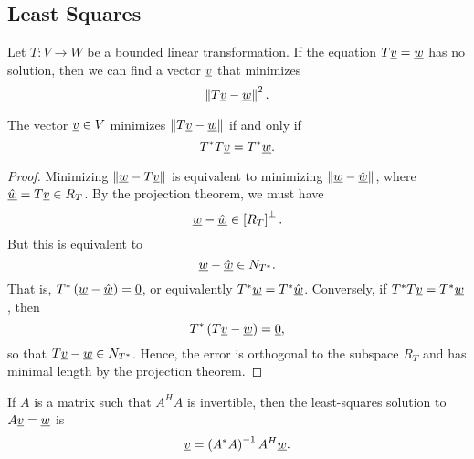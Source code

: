 \subsection{Least Squares}

Let $T : V \rightarrow W$ be a bounded linear transformation.
If the equation $T \underline{v} = \underline{w}$ has no solution, then we can find a vector $\underline{v}$ that minimizes
\begin{equation*}
\left\| T \underline{v} - \underline{w} \right\|^2.
\end{equation*}

\begin{theorem}
The vector $\underline{v} \in V$ minimizes $\left\| T \underline{v} - \underline{w} \right\|$ if and only if
\begin{equation*}
T^* T \underline{v} = T^* \underline{w} .
\end{equation*}
\end{theorem}
\begin{proof}
Minimizing $\left\| \underline{w} - T \underline{v} \right\|$ is equivalent to minimizing $\left\| \underline{w} - \hat{\underline{w}} \right\|$, where $\hat{\underline{w}} = T\underline{v} \in R_T$.
By the projection theorem, we must have
\begin{equation*}
\underline{w} - \hat{\underline{w}} \in \left[ R_T \right]^{\bot} .
\end{equation*}
But this is equivalent to
\begin{equation*}
\underline{w} - \hat{\underline{w}} \in N_{T^*} .
\end{equation*}
That is, $T^* \left( \underline{w} - \hat{\underline{w}} \right) = \underline{0}$, or equivalently $T^* \underline{w} = T^* \hat{\underline{w}}$.
Conversely, if $T^*T \underline{v} = T^* \underline{w}$, then
\begin{equation*}
T^* \left( T \underline{v} - \underline{w} \right) = \underline{0},
\end{equation*}
so that $T \underline{v} - \underline{w} \in N_{T^*}$.
Hence, the error is orthogonal to the subspace $R_T$ and has minimal length by the projection theorem.
\end{proof}

\begin{corollary}
If $A$ is a matrix such that $A^H A$ is invertible, then the least-squares solution to $A \underline{v} = \underline{w}$ is
\begin{equation*}
\underline{v} = \left( A^* A \right)^{-1} A^H \underline{w}.
\end{equation*}
\end{corollary}

